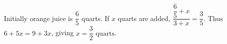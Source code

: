 Initially orange juice is $\dfrac{6}{5}$ quarts. If $x$ quarts are added, $\dfrac{\dfrac{6}{5}+x}{3+x}=\dfrac{3}{5}$. Thus $6+5x=9+3x$, giving $\boxed{x=\dfrac{3}{2}\text{ quarts}}$.
